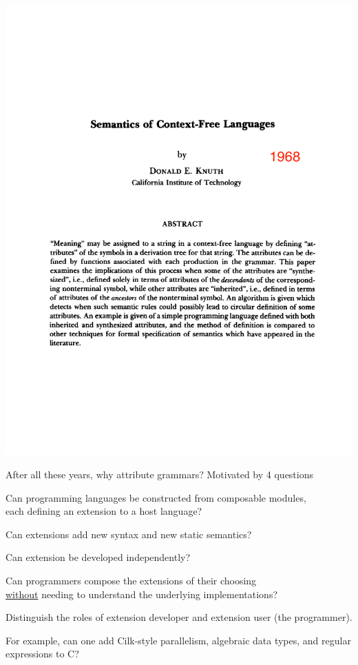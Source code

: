 \documentclass[11pt,aspectratio=169]{beamer}
\begin{document}
\begin{frame}%
\includegraphics[width=0.95\linewidth,trim={0 0 0 7cm},clip]{Knuth-Page-1-with-date.pdf}
\end{frame}


\begin{frame}{After all these years, why attribute grammars?}
\pause
Motivated by 4 questions

\bigskip\pause
\bes{0.3cm}
\x Can programming languages be constructed from composable modules, \\
   each defining an extension to a host language?

\pause
\x Can extensions add new syntax and new static semantics?

\pause
\x Can extension be developed independently?

\pause
\x Can programmers compose the extensions of their choosing \\
   \underline{without} needing to understand the underlying
   implementations?

   \bigskip
   Distinguish the roles of extension developer and extension user
   (the programmer).

   \pause
   \bigskip
   For example, can one add Cilk-style parallelism, algebraic data types,
   and regular expressions to C?
\ee

\end{frame}
\end{document}
